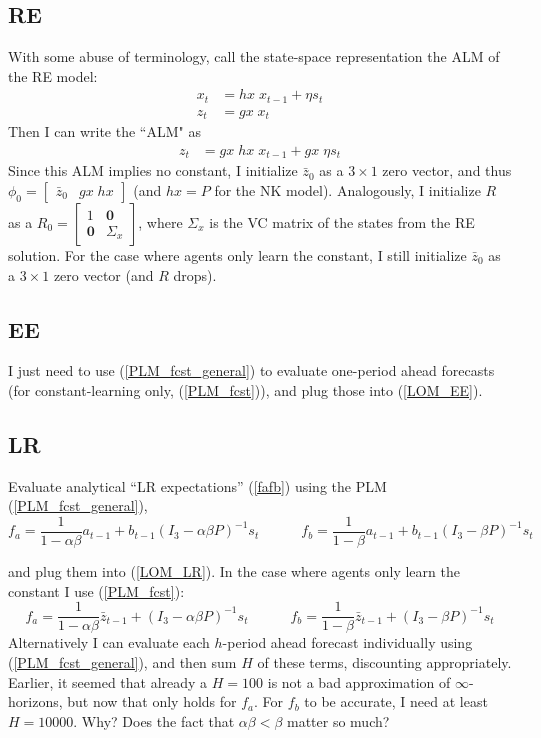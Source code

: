 \documentclass[11pt]{article}
\renewcommand{\[}{\begin{equation}}
\renewcommand{\]}{\end{equation}}
\begin{document}
\subsection{RE}
With some abuse of terminology, call the state-space representation the ALM of the RE model:
\begin{align}
x_{t} & = hx \; x_{t-1} + \eta s_t \label{state_eq}\\
z_t & = gx \; x_t \label{obs_eq}
\end{align}
Then I can write the ``ALM" as
\begin{align}
z_t & = gx \; hx \; x_{t-1} + gx \; \eta s_t  \label{ALM_RE}
\end{align}
Since this ALM implies no constant, I initialize $\bar{z}_0$ as a $3\times1$ zero vector, and thus $\phi_0 = \begin{bmatrix} \bar{z}_0 & gx \; hx\end{bmatrix} $ (and $hx = P$ for the NK model). Analogously, I initialize $R$ as a $R_0 = \begin{bmatrix} 1 & \mathbf{0} \\ \mathbf{0} & \Sigma_x \end{bmatrix}$, where $\Sigma_x$ is the VC matrix of the states from the RE solution. For the case where agents only learn the constant, I still initialize $\bar{z}_0$ as a $3\times1$ zero vector (and $R$ drops).
\subsection{EE}
I just need to use (\ref{PLM_fcst_general}) to evaluate one-period ahead forecasts (for constant-learning only, (\ref{PLM_fcst})), and plug those into (\ref{LOM_EE}).

\subsection{LR}
Evaluate analytical ``LR expectations'' (\ref{fafb}) using the PLM (\ref{PLM_fcst_general}), 
\begin{equation}
f_a = \frac{1}{1-\alpha\beta}a_{t-1}  + b_{t-1}(I_3 - \alpha\beta P)^{-1}s_t \quad \quad \quad f_b = \frac{1}{1-\beta}a_{t-1}  + b_{t-1}(I_3 - \beta P)^{-1}s_t  \label{fafb_analytical_general}
\end{equation}

and plug them into (\ref{LOM_LR}). In the case where agents only learn the constant I use (\ref{PLM_fcst}):
\begin{equation}
f_a = \frac{1}{1-\alpha\beta}\bar{z}_{t-1}  + (I_3 - \alpha\beta P)^{-1}s_t \quad \quad \quad f_b = \frac{1}{1-\beta}\bar{z}_{t-1}  + (I_3 - \beta P)^{-1}s_t  \label{fafb_analytical}
\end{equation}
Alternatively I can evaluate each $h$-period ahead forecast individually using (\ref{PLM_fcst_general}), and then sum $H$ of these terms, discounting appropriately. Earlier, it seemed that already a $H=100$ is not a bad approximation of $\infty$-horizons, but now that only holds for $f_a$. For $f_b$ to be accurate, I need at least $H=10000$. Why? Does the fact that $\alpha\beta < \beta$ matter so much?
\end{document}
